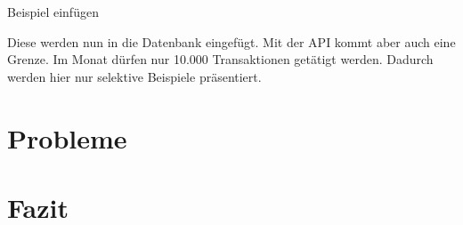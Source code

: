 \documentclass[a4paper,12pt]{article}
\begin{document}
	\begin{center}
		Beispiel einfügen
	\end{center}
	
	Diese werden nun in die Datenbank eingefügt. Mit der API kommt aber auch eine Grenze. Im Monat dürfen nur 10.000 Transaktionen getätigt werden. Dadurch werden hier nur selektive Beispiele präsentiert. 
	
	\section{Probleme}
	\section{Fazit}
	\appendix
\end{document}
